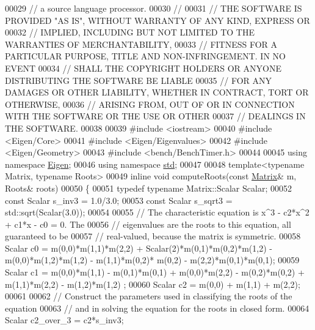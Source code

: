 \begin{DoxyCode}
00029 \textcolor{comment}{// a source language processor.}
00030 \textcolor{comment}{// }
00031 \textcolor{comment}{// THE SOFTWARE IS PROVIDED "AS IS", WITHOUT WARRANTY OF ANY KIND, EXPRESS OR}
00032 \textcolor{comment}{// IMPLIED, INCLUDING BUT NOT LIMITED TO THE WARRANTIES OF MERCHANTABILITY,}
00033 \textcolor{comment}{// FITNESS FOR A PARTICULAR PURPOSE, TITLE AND NON-INFRINGEMENT. IN NO EVENT}
00034 \textcolor{comment}{// SHALL THE COPYRIGHT HOLDERS OR ANYONE DISTRIBUTING THE SOFTWARE BE LIABLE}
00035 \textcolor{comment}{// FOR ANY DAMAGES OR OTHER LIABILITY, WHETHER IN CONTRACT, TORT OR OTHERWISE,}
00036 \textcolor{comment}{// ARISING FROM, OUT OF OR IN CONNECTION WITH THE SOFTWARE OR THE USE OR OTHER}
00037 \textcolor{comment}{// DEALINGS IN THE SOFTWARE.}
00038 
00039 \textcolor{preprocessor}{#include <iostream>}
00040 \textcolor{preprocessor}{#include <Eigen/Core>}
00041 \textcolor{preprocessor}{#include <Eigen/Eigenvalues>}
00042 \textcolor{preprocessor}{#include <Eigen/Geometry>}
00043 \textcolor{preprocessor}{#include <bench/BenchTimer.h>}
00044 
00045 \textcolor{keyword}{using namespace }\hyperlink{namespace_eigen}{Eigen};
00046 \textcolor{keyword}{using namespace }\hyperlink{namespacestd}{std};
00047 
00048 \textcolor{keyword}{template}<\textcolor{keyword}{typename} Matrix, \textcolor{keyword}{typename} Roots>
00049 \textcolor{keyword}{inline} \textcolor{keywordtype}{void} computeRoots(\textcolor{keyword}{const} \hyperlink{group___core___module_class_eigen_1_1_matrix}{Matrix}& m, Roots& roots)
00050 \{
00051   \textcolor{keyword}{typedef} \textcolor{keyword}{typename} Matrix::Scalar Scalar;
00052   \textcolor{keyword}{const} Scalar s\_inv3 = 1.0/3.0;
00053   \textcolor{keyword}{const} Scalar s\_sqrt3 = std::sqrt(Scalar(3.0));
00054 
00055   \textcolor{comment}{// The characteristic equation is x^3 - c2*x^2 + c1*x - c0 = 0.  The}
00056   \textcolor{comment}{// eigenvalues are the roots to this equation, all guaranteed to be}
00057   \textcolor{comment}{// real-valued, because the matrix is symmetric.}
00058   Scalar c0 = m(0,0)*m(1,1)*m(2,2) + Scalar(2)*m(0,1)*m(0,2)*m(1,2) - m(0,0)*m(1,2)*m(1,2) - m(1,1)*m(0,2)*
      m(0,2) - m(2,2)*m(0,1)*m(0,1);
00059   Scalar c1 = m(0,0)*m(1,1) - m(0,1)*m(0,1) + m(0,0)*m(2,2) - m(0,2)*m(0,2) + m(1,1)*m(2,2) - m(1,2)*m(1,2)
      ;
00060   Scalar c2 = m(0,0) + m(1,1) + m(2,2);
00061 
00062   \textcolor{comment}{// Construct the parameters used in classifying the roots of the equation}
00063   \textcolor{comment}{// and in solving the equation for the roots in closed form.}
00064   Scalar c2\_over\_3 = c2*s\_inv3;

\end{DoxyCode}
